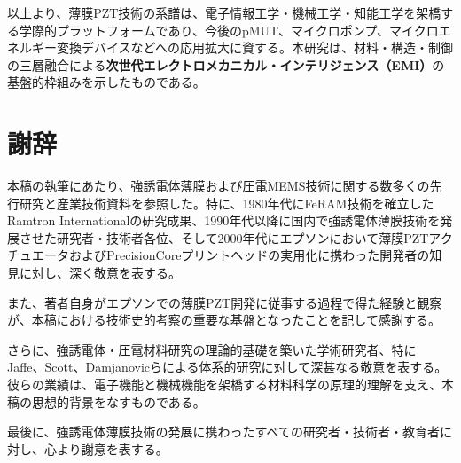 \documentclass[conference]{IEEEtran}
\begin{document}
\medskip
以上より、薄膜PZT技術の系譜は、電子情報工学・機械工学・知能工学を架橋する学際的プラットフォームであり、今後のpMUT、マイクロポンプ、マイクロエネルギー変換デバイスなどへの応用拡大に資する。本研究は、材料・構造・制御の三層融合による\textbf{次世代エレクトロメカニカル・インテリジェンス（EMI）}の基盤的枠組みを示したものである。

\section*{謝辞}
本稿の執筆にあたり、強誘電体薄膜および圧電MEMS技術に関する数多くの先行研究と産業技術資料を参照した。特に、1980年代にFeRAM技術を確立したRamtron Internationalの研究成果、1990年代以降に国内で強誘電体薄膜技術を発展させた研究者・技術者各位、そして2000年代にエプソンにおいて薄膜PZTアクチュエータおよびPrecisionCoreプリントヘッドの実用化に携わった開発者の知見に対し、深く敬意を表する。

また、著者自身がエプソンでの薄膜PZT開発に従事する過程で得た経験と観察が、本稿における技術史的考察の重要な基盤となったことを記して感謝する。

さらに、強誘電体・圧電材料研究の理論的基礎を築いた学術研究者、特にJaffe、Scott、Damjanovicらによる体系的研究に対して深甚なる敬意を表する。彼らの業績は、電子機能と機械機能を架橋する材料科学の原理的理解を支え、本稿の思想的背景をなすものである。

最後に、強誘電体薄膜技術の発展に携わったすべての研究者・技術者・教育者に対し、心より謝意を表する。
\end{document}
